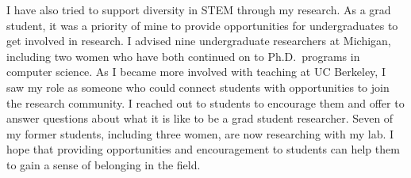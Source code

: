 \documentclass[11pt]{article} %
\begin{document}

I have also tried to support diversity in STEM through my research.
%
As a grad student, it was a priority of mine to provide opportunities for
undergraduates to get involved in research. I advised nine undergraduate
researchers at Michigan, including two women who have both continued on to
Ph.D.\ programs in computer science.
%
As I became more involved with teaching at UC Berkeley, I saw my role as
someone who could connect students with opportunities to join the research
community.
I reached out
to students to encourage them and offer to answer questions about what it is
like to be a grad student researcher. Seven of my former students, including
three women, are now researching with my lab.
%
I hope that providing opportunities and encouragement to students can help them
to gain a sense of belonging in the field.

%
\end{document}
